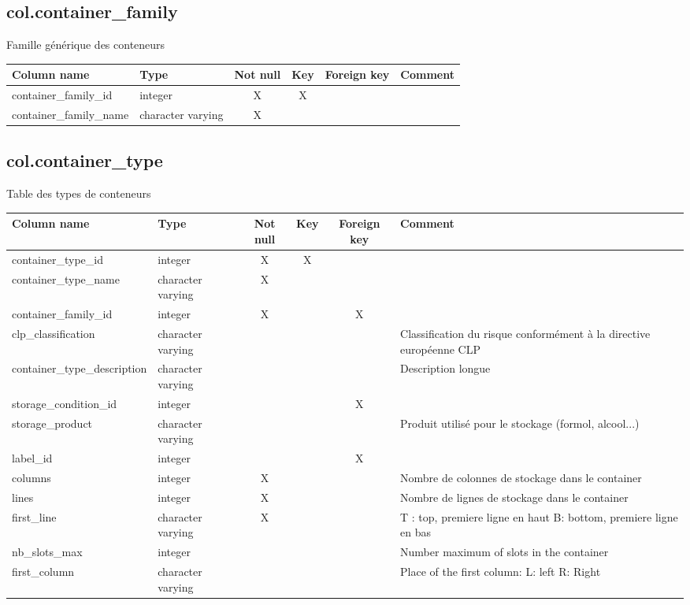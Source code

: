 \subsection{col.container\_family}
Famille générique des conteneurs

\begin{tabular}{|l| p{2cm}|c|c|c| p{3cm}|}
\hline
Column name & Type & Not null & Key & Foreign key & Comment \\
\hline
container\_family\_id & integer & X & X & & \\
\hline
container\_family\_name & character varying & X & & & \\
\hline
\end{tabular}
\subsection{col.container\_type}
Table des types de conteneurs

\begin{tabular}{|l| p{2cm}|c|c|c| p{3cm}|}
\hline
Column name & Type & Not null & Key & Foreign key & Comment \\
\hline
container\_type\_id & integer & X & X & & \\
\hline
container\_type\_name & character varying & X & & & \\
\hline
container\_family\_id & integer & X & & X & \\
\hline
clp\_classification & character varying & & & & Classification du risque conformément à la directive européenne CLP\\
\hline
container\_type\_description & character varying & & & & Description longue\\
\hline
storage\_condition\_id & integer & & & X & \\
\hline
storage\_product & character varying & & & & Produit utilisé pour le stockage (formol, alcool...)\\
\hline
label\_id & integer & & & X & \\
\hline
columns & integer & X & & & Nombre de colonnes de stockage dans le container\\
\hline
lines & integer & X & & & Nombre de lignes de stockage dans le container\\
\hline
first\_line & character varying & X & & & T : top, premiere ligne en haut B: bottom, premiere ligne en bas\\
\hline
nb\_slots\_max & integer & & & & Number maximum of slots in the container\\
\hline
first\_column & character varying & & & & Place of the first column: L: left R: Right\\
\hline
\end{tabular}
